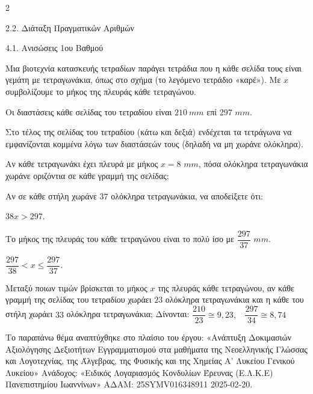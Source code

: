 \begin{ylh}{2}
    \item 2.2. Διάταξη Πραγματικών Αριθμών
    \item 4.1. Ανισώσεις 1ου Βαθμού
\end{ylh}
Μια βιοτεχνία κατασκευής τετραδίων παράγει τετράδια που η κάθε σελίδα τους είναι γεμάτη με τετραγωνάκια, όπως στο σχήμα (το λεγόμενο τετράδιο «καρέ»). Με $x$ συμβολίζουμε το μήκος της πλευράς κάθε τετραγώνου.

Οι διαστάσεις κάθε σελίδας του τετραδίου είναι $210\ mm$ επί 297 $mm$.

Στο τέλος της σελίδας του τετραδίου (κάτω και δεξιά) ενδέχεται τα τετράγωνα να εμφανίζονται κομμένα λόγω των διαστάσεών τους (δηλαδή να μη χωράνε ολόκληρα).

\begin{alist}
\item Αν κάθε τετραγωνάκι έχει πλευρά με μήκος $x = 8$ $mm$, πόσα ολόκληρα τετραγωνάκια χωράνε οριζόντια σε κάθε γραμμή της σελίδας;
\item Αν σε κάθε στήλη χωράνε $37$ ολόκληρα τετραγωνάκια, να αποδείξετε ότι:

\begin{rlist}
\item $38x > 297$.
\item Το μήκος της πλευράς του κάθε τετραγώνου είναι το πολύ ίσο με $\dfrac{297}{37}$ $mm$.
\item $\dfrac{297}{38} < x \leq \dfrac{297}{37}.$
\end{rlist}
\item Μεταξύ ποιων τιμών βρίσκεται το μήκος $x$ της πλευράς κάθε τετραγώνου, αν κάθε γραμμή της σελίδας του τετραδίου χωράει $23$ ολόκληρα τετραγωνάκια και η κάθε του στήλη χωράει $33$ ολόκληρα τετραγωνάκια;
Δίνονται: $\dfrac{210}{23} \cong 9,23,\ \ \ \ \dfrac{297}{34} \cong 8,74$
\end{alist}
{\footnotesize Το παραπάνω θέμα αναπτύχθηκε στο πλαίσιο του έργου: «Ανάπτυξη Δοκιμασιών Αξιολόγησης Δεξιοτήτων Εγγραμματισμού στα μαθήματα της Νεοελληνικής Γλώσσας και Λογοτεχνίας, της Άλγεβρας, της Φυσικής και της Χημείας Α' Λυκείου Γενικού Λυκείου» Ανάδοχος: «Ειδικός Λογαριασμός Κονδυλίων Έρευνας (Ε.Λ.Κ.Ε) Πανεπιστημίου Ιωαννίνων» ΑΔΑΜ: 25SYMV016348911 2025-02-20.
}

